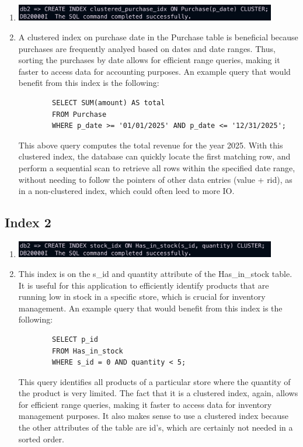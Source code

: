 \documentclass[a4paper,11pt]{article}
\begin{document}
\begin{enumerate}[label=(\alph*)]
    \item \includegraphics[width=0.9\textwidth]{images/idx1.png}
    \item A clustered index on purchase date in the Purchase table is beneficial because purchases are frequently analyed based on dates and date ranges.
    Thus, sorting the purchases by date allows for efficient range queries, making it faster to access data for accounting purposes.
    An example query that would benefit from this index is the following:
    \begin{lstlisting}
        SELECT SUM(amount) AS total
        FROM Purchase
        WHERE p_date >= '01/01/2025' AND p_date <= '12/31/2025';
    \end{lstlisting}
    This above query computes the total revenue for the year 2025. With this clustered index, the database can quickly locate the first matching row, and perform a sequential scan to retrieve all rows within the specified date range, without needing to follow the pointers of other data entries (value + rid), as in a non-clustered index, which could often leed to more IO.
\end{enumerate}

\subsection*{Index 2}
\begin{enumerate}[label=(\alph*)]
    \item \includegraphics[width=0.9\textwidth]{images/idx2.png}
    \item This index is on the s\_id and quantity attribute of the Has\_in\_stock table.
    It is useful for this application to efficiently identify products that are running low in stock in a specific store, which is crucial for inventory management.
    An example query that would benefit from this index is the following:
    \begin{lstlisting}
        SELECT p_id
        FROM Has_in_stock
        WHERE s_id = 0 AND quantity < 5;
    \end{lstlisting}
    This query identifies all products of a particular store where the quantity of the product is very limited.
    The fact that it is a clustered index, again, allows for efficient range queries, making it faster to access data for inventory management purposes.
    It also makes sense to use a clustered index because the other attributes of the table are id's, which are certainly not needed in a sorted order.
\end{enumerate}
\end{document}
